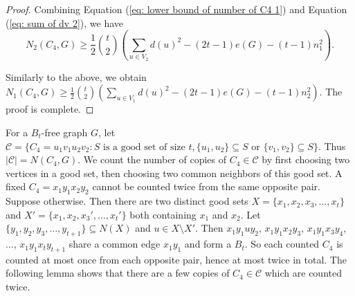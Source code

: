 \documentclass[11pt,a4paper]{article}
\newtheorem{lemma}{Lemma}[section]
\theoremstyle{definition}
\begin{document}
\begin{proof}
            Combining Equation (\ref{eq: lower bound of number of C4 1}) and Equation (\ref{eq: sum of dv 2}), we have
            \begin{equation*}
                N_2(C_4, G) \geq \frac{1}{2} \binom{t}{2} \left(\sum_{u \in V_2} d(u)^2 - (2t-1) e(G) - (t-1) n_1^2 \right).
            \end{equation*}

            Similarly to the above, we obtain $N_1(C_4, G) \geq \frac{1}{2} \binom{t}{2} (\sum_{u \in V_1} d(u)^2 - (2t-1) e(G) - (t-1) n_2^2)$.
            The proof is complete.
        \end{proof}




        For a $B_t$-free graph $G$, let $\mathcal{C} = \{C_4 = u_1 v_1 u_2 v_2: S \text{ is a good set of size } t, \{u_1, u_2\} \subseteq S \text{ or } \{v_1, v_2\} \subseteq S\}$.
        Thus $|\mathcal{C}| = N(C_4, G)$.
        We count the number of copies of $C_4 \in \mathcal{C}$ by first choosing two vertices in a good set, then choosing two common neighbors of this good set.
        A fixed $C_4 = x_1 y_1 x_2 y_2$ cannot be counted twice from the same opposite pair.
        Suppose otherwise. Then there are two distinct good sets $X = \{x_1, x_2, x_3, \dots, x_t\}$ and $X' = \{x_1, x_2, x_3', \dots, x_t'\}$ both containing $x_1$ and $x_2$.
        Let $\{y_1, y_2, y_3, \dots, y_{t+1}\} \subseteq N(X)$ and $u \in X \setminus X'$.
        Then $x_1 y_1 u y_2$, $x_1 y_1 x_2 y_3$, $x_1 y_1 x_3 y_4$, $\dots$, $x_1 y_1 x_t y_{t+1}$ share a common edge $x_1 y_1$ and form a $B_t$.
        So each counted $C_4$ is counted at most once from each opposite pair, hence at most twice in total.
        The following lemma shows that there are a few copies of $C_4 \in \mathcal{C}$ which are counted twice.
\end{document}
